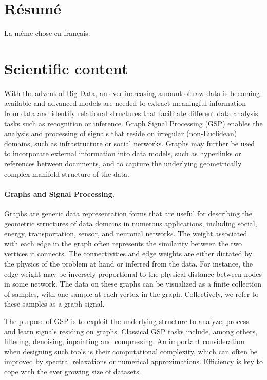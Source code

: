 \documentclass[a4paper]{scrartcl}
\begin{document}
\section{Résumé}

La même chose en français.


\section{Scientific content}

With the advent of Big Data, an ever increasing amount of raw data is becoming
available and advanced models are needed to extract meaningful information from
data and identify relational structures that facilitate different data analysis
tasks such as recognition or inference. Graph Signal Processing (GSP) enables
the analysis and processing of signals that reside on irregular (non-Euclidean)
domains, such as infrastructure or social networks. Graphs may further be used
to incorporate external information into data models, such as hyperlinks or
references between documents, and to capture the underlying geometrically
complex manifold structure of the data.

\paragraph{Graphs and Signal Processing.}
Graphs are generic data representation forms that are useful for describing the
geometric structures of data domains in numerous applications, including social,
energy, transportation, sensor, and neuronal networks.
The weight associated with each edge in the graph often represents the
similarity between the two vertices it connects. The connectivities and edge
weights are either dictated by the physics of the problem at hand or inferred
from the data. For instance, the edge weight may be inversely proportional to
the physical distance between nodes in some network.
The data on these graphs can be visualized as a finite collection of samples,
with one sample at each vertex in the graph. Collectively, we refer to these
samples as a graph signal. 

The purpose of GSP is to exploit the underlying structure to analyze, process
and learn signals residing on graphs. 
Classical GSP tasks include, among others, filtering, denoising, inpainting and
compressing. An important consideration when designing such tools is their
computational complexity, which can often be improved by spectral relaxations or
numerical approximations. Efficiency is key to cope with the ever growing size
of datasets.
\end{document}

